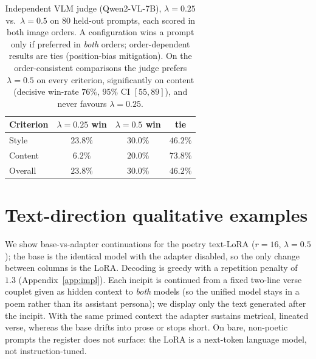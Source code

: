 \begin{table}[t]
\centering\small
\setlength{\tabcolsep}{8pt}
\begin{tabular}{lccc}
\toprule
Criterion & $\lambda{=}0.25$ win & $\lambda{=}0.5$ win & tie \\
\midrule
Style    & $23.8\%$ & $\mathbf{30.0\%}$ & $46.2\%$ \\
Content  & $6.2\%$  & $\mathbf{20.0\%}$ & $73.8\%$ \\
Overall  & $23.8\%$ & $\mathbf{30.0\%}$ & $46.2\%$ \\
\bottomrule
\end{tabular}
\caption{Independent VLM judge (Qwen2-VL-7B), $\lambda{=}0.25$ vs.\ $\lambda{=}0.5$
on $80$ held-out prompts, each scored in both image orders. A configuration wins a
prompt only if preferred in \emph{both} orders; order-dependent results are ties
(position-bias mitigation). On the order-consistent comparisons the judge prefers
$\lambda{=}0.5$ on every criterion, significantly on content (decisive win-rate
$76\%$, $95\%$ CI $[55,89]$), and never favours $\lambda{=}0.25$.}
\label{tab:judge}
\end{table}

\clearpage
\section{Text-direction qualitative examples}
\label{app:textqual}
We show base-vs-adapter continuations for the poetry text-LoRA ($r{=}16$,
$\lambda{=}0.5$); the base is the identical model with the adapter disabled, so the
only change between columns is the LoRA. Decoding is greedy with a repetition
penalty of $1.3$ (Appendix~\ref{app:impl}). Each incipit is continued from a fixed
two-line verse couplet given as hidden context to \emph{both} models (so the
unified model stays in a poem rather than its assistant persona); we display only
the text generated after the incipit. With the same primed context the adapter
sustains metrical, lineated verse, whereas the base drifts into prose or stops
short. On bare, non-poetic prompts the register does not surface: the LoRA is a
next-token language model, not instruction-tuned.

